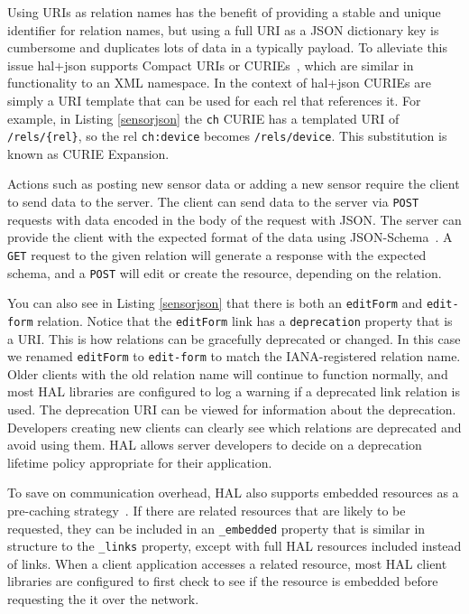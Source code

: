 \documentclass{acm_proc_article-sp}
\begin{document}
Using URIs as relation names has the benefit of providing a stable and unique
identifier for relation names, but using a full URI as a JSON dictionary key is
cumbersome and duplicates lots of data in a typically payload. To alleviate this
issue hal+json supports Compact URIs or CURIEs~\cite{curies}, which are similar in
functionality to an XML namespace. In the context of hal+json CURIEs are simply
a URI template that can be used for each rel that references it. For example,
in Listing \ref{sensorjson} the \texttt{ch} CURIE has a templated URI of
\texttt{/rels/\{rel\}}, so the rel \texttt{ch:device} becomes
\texttt{/rels/device}. This substitution is known as CURIE Expansion.

Actions such as posting new sensor data or adding a new sensor require the
client to send data to the server. The client can send data to the server via
\texttt{POST} requests with data encoded in the body of the request with JSON.
The server can provide the client with the expected format of the data using
JSON-Schema~\cite{json-schema-draft}. A \texttt{GET} request to the given
relation will generate a response with the expected schema, and a \texttt{POST}
will edit or create the resource, depending on the relation.

You can also see in Listing \ref{sensorjson} that there is both an
\mbox{\texttt{editForm}} and \texttt{edit-form} relation. Notice that the
\texttt{editForm} link has a \texttt{deprecation} property that is a URI.  This
is how relations can be gracefully deprecated or changed. In this case we
renamed \texttt{editForm} to \texttt{edit-form} to match the IANA-registered
relation name. Older clients with the old relation name will continue to
function normally, and most HAL libraries are configured to log a warning if a
deprecated link relation is used. The deprecation URI can be viewed for
information about the deprecation. Developers creating new clients can clearly
see which relations are deprecated and avoid using them. HAL allows server
developers to decide on a deprecation lifetime policy appropriate for their
application.

To save on communication overhead, HAL also supports embedded resources as a
pre-caching strategy~\cite{json-hal-draft}. If there are related resources that
are likely to be requested, they can be included in an \texttt{\_embedded}
property that is similar in structure to the \texttt{\_links} property, except
with full HAL resources included instead of links. When a client application
accesses a related resource, most HAL client libraries are configured to first
check to see if the resource is embedded before requesting the it over the
network.
\end{document}
